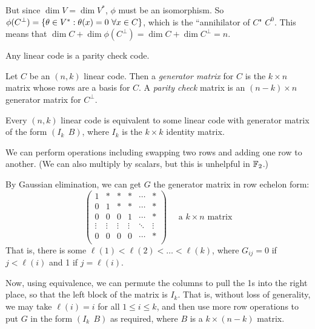 \documentclass{article}
\begin{document}
But since $\dim V = \dim V^*$, $\phi$ must be an isomorphism.
So $\phi(C^\bot) = \left\lbrace \theta \in V^* : \theta(x) = 0 \ \forall x \in C \right\rbrace$,
which is the ``annihilator of $C$" $C^0$.
This means that
$\dim C + \dim \phi(C^\bot) = \dim C + \dim C^\bot = n$.

\begin{corollary}
    Any linear code is a parity check code.
\end{corollary}

\begin{definition}
	\label{generator-parity-check-matrix}
    Let $C$ be an $(n, k)$ linear code.
    Then a \textit{generator matrix} for $C$ is the $k \times n$ matrix whose rows are a basis for $C$. A \textit{parity check} matrix is an $(n-k) \times n$ generator matrix for $C^\bot$.
\end{definition}

\begin{proposition}[Equivalence]
    Every $(n, k)$ linear code is equivalent to some linear code with generator matrix of the form
    $(I_k \ \ B)$, where $I_k$ is the $k \times k$ identity matrix.
\end{proposition}

\begin{prf}
    We can perform operations including swapping two rows and adding one row to another.
    (We can also multiply by scalars, but this is unhelpful in $\mathbb{F}_2$.)
    
    By Gaussian elimination, we can get $G$ the generator matrix in row echelon form:
    \[
	\begin{pmatrix}
		1 & * & * & * & \cdots & * \\
		0 & 1 & * & * & \cdots & * \\
		0 & 0 & 0 & 1 & \cdots & * \\
		\vdots & \vdots & \vdots & \vdots & \ddots & \vdots \\
		0 & 0 & 0 & 0 & \cdots & * \\
	\end{pmatrix}
	\quad
	\text{ a $k \times n$ matrix}
	\]
	That is, there is some $\ell(1) < \ell(2) < \dots < \ell(k)$, where $G_{ij} = 0$ if $j < \ell(i)$ and 1 if $j = \ell(i)$.
	
	Now, using equivalence, we can permute the columns to pull the 1s into the right place, so that the left block of the matrix is $I_k$.
	That is, without loss of generality, we may take $\ell(i) = i$ for all $1 \leq i \leq k$, and then use more row operations to put $G$ in the form $(I_k \ \ B )$ as required, where $B$ is a $k \times (n-k)$ matrix.
\end{prf}
\end{document}
